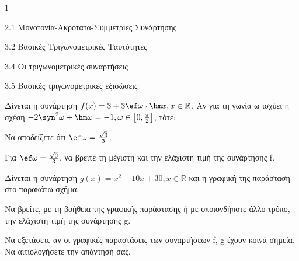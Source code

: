 \begin{ylh}{1}
\item 2.1 Μονοτονία-Ακρότατα-Συμμετρίες Συνάρτησης
\item 3.2 Βασικές Τριγωνομετρικές Ταυτότητες
\item 3.4 Οι τριγωνομετρικές συναρτήσεις
\item 3.5 Βασικές τριγωνομετρικές εξισώσεις
\end{ylh}
Δίνεται η συνάρτηση $f(x) = 3 + 3\ef \omega\cdot \hm  x, x \in \mathbb{R}$. Αν για τη γωνία ω ισχύει η σχέση $-2\syn ^2\omega + \hm \omega = -1, \omega \in \left[0, \frac{\pi}{2}\right]$, τότε:
\begin{alist}
\item
\begin{rlist}
\item
  Να αποδείξετε ότι $\ef \omega = \frac{\sqrt{3}}{3}$.
\item
  Για $\ef \omega = \frac{\sqrt{3}}{3}$, να βρείτε τη μέγιστη και την ελάχιστη τιμή της συνάρτησης f.
\end{rlist}
\item Δίνεται η συνάρτηση $g(x) = x^2 - 10x + 30, x \in \mathbb{R}$ και η γραφική της παράσταση στο παρακάτω σχήμα.
\begin{center}
\end{center}
\begin{rlist}
\item
  Να βρείτε, με τη βοήθεια της γραφικής παράστασης ή με οποιονδήποτε άλλο τρόπο, την ελάχιστη τιμή της συνάρτησης g.
\item
  Να εξετάσετε αν οι γραφικές παραστάσεις των συναρτήσεων f, g έχουν κοινά σημεία. Να αιτιολογήσετε την απάντησή σας.
\end{rlist}
\end{alist}

